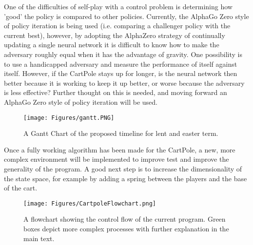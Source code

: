 \documentclass[12pt]{article}
\begin{document}
 One of the difficulties of self-play with a control problem is determining how 'good' the policy is compared to other policies. Currently, the AlphaGo Zero style of policy iteration is being used (i.e. comparing a challenger policy with the current best), however, by adopting the AlphaZero strategy of continually updating a single neural network it is difficult to know how to make the adversary roughly equal when it has the advantage of gravity. One possibility is to use a handicapped adversary and measure the performance of itself against itself. However, if the CartPole stays up for longer, is the neural network then better because it is working to keep it up better, or worse because the adversary is less effective? Further thought on this is needed, and moving forward an AlphaGo Zero style of policy iteration will be used.

\begin{figure}[h]
   \centering
   \texttt{[image: Figures/gantt.PNG]}
   \caption{\label{fig:gantt} A Gantt Chart of the proposed timeline for lent and easter term.}
\end{figure}

Once a fully working algorithm has been made for the CartPole, a new, more complex environment will be implemented to improve test and improve the generality of the program. A good next step is to increase the dimensionality of the state space, for example by adding a spring between the players and the base of the cart.




\begin{figure}[b]
   \centering
   \texttt{[image: Figures/CartpoleFlowchart.png]}
   \caption{\label{fig:flowchart} A flowchart showing the control flow of the current program. Green boxes depict more complex processes with further explanation in the main text.}
\end{figure}
\end{document}
